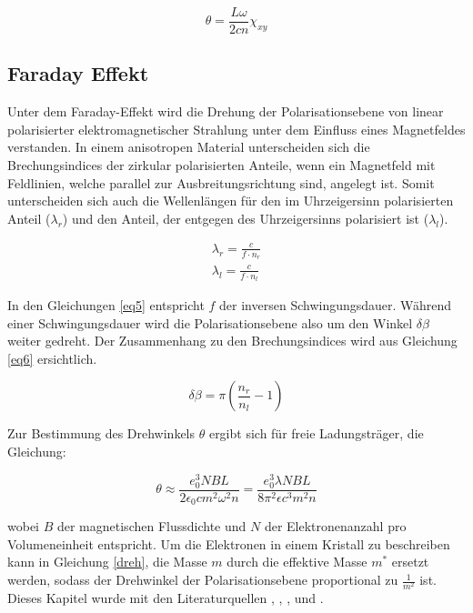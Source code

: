 \begin{equation}
    \theta = \frac{L\omega}{2cn} \chi_{xy}
    \label{eq4}
\end{equation}

\subsection{Faraday Effekt}
Unter dem Faraday-Effekt wird die Drehung der Polarisationsebene von linear 
polarisierter
elektromagnetischer Strahlung unter dem Einfluss eines Magnetfeldes verstanden.
In einem anisotropen Material unterscheiden sich die Brechungsindices der 
zirkular polarisierten Anteile, wenn ein Magnetfeld mit Feldlinien, welche 
parallel zur Ausbreitungsrichtung sind, angelegt ist. Somit 
unterscheiden sich auch die Wellenlängen für den im Uhrzeigersinn polarisierten 
Anteil ($\lambda_{r}$) und den Anteil, der entgegen des Uhrzeigersinns polarisiert 
ist ($\lambda_{l}$).

\begin{align}
    \lambda_{r} = \frac{c}{f\cdot n_{r}}\\
    \lambda_{l} = \frac{c}{f\cdot n_{l}}
    \label{eq5}
\end{align}

In den Gleichungen \ref{eq5} entspricht $f$ der inversen Schwingungsdauer.
Während einer Schwingungsdauer wird die Polarisationsebene also um den Winkel 
$\delta \beta$ weiter gedreht. Der Zusammenhang zu den Brechungsindices wird aus 
Gleichung \ref{eq6} ersichtlich.

\begin{equation}
    \delta \beta = \pi \left( \frac{n_r}{n_l} -1 \right)
    \label{eq6}
\end{equation}

Zur Bestimmung des Drehwinkels $\theta$ ergibt sich für freie Ladungsträger,
die Gleichung:

\begin{equation}
    \theta \approx \frac{e_0^3 N B L}{2 \epsilon_0 c m^2 \omega^2 n} = \frac{e_0^3 \lambda NBL}{8 \pi^2 \epsilon c^3 m^2 n}
    \label{dreh}
\end{equation}

wobei $B$ der magnetischen Flussdichte und $N$ der Elektronenanzahl pro 
Volumeneinheit entspricht. Um die Elektronen in einem 
Kristall zu beschreiben kann in Gleichung \ref{dreh}, die Masse $m$ durch die 
effektive Masse $m^*$ ersetzt werden, sodass der Drehwinkel der Polarisationsebene 
proportional zu $\frac{1}{m^2}$ ist.
Dieses Kapitel wurde mit den Literaturquellen
\cite{sample}, \cite{demt}, \cite{exp}, \cite{switch} und \cite{eng}.

